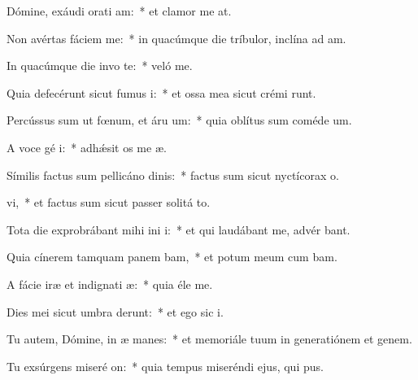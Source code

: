 \item Dómine, exáudi orati am:~* et clamor me   at.
\item Non avértas fáciem   me:~* in quacúmque die tríbulor, inclína ad   am.
\item In quacúmque die invo te:~* veló  me.
\item Quia defecérunt sicut fumus  i:~* et ossa mea sicut crémi runt.
\item Percússus sum ut fœnum, et áru  um:~* quia oblítus sum coméde  um.
\item A voce gé i:~* adhǽsit os me  æ.
\item Símilis factus sum pellicáno dinis:~* factus sum sicut nyctícorax  o.
\item {}vi,~* et factus sum sicut passer solitá  to.
\item Tota die exprobrábant mihi ini i:~* et qui laudábant me, advér  bant.
\item Quia cínerem tamquam panem bam,~* et potum meum cum  bam.
\item A fácie iræ et indignati æ:~* quia éle  me.
\item Dies mei sicut umbra derunt:~* et ego sic  i.
\item Tu autem, Dómine, in æ manes:~* et memoriále tuum in generatiónem et genem.
\item Tu exsúrgens miseré on:~* quia tempus miseréndi ejus, qui  pus.
